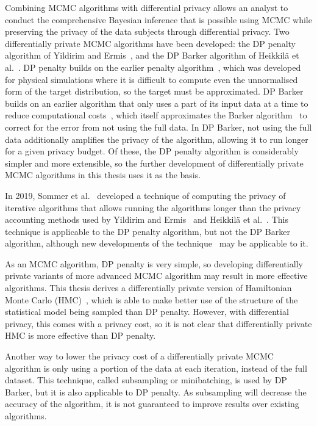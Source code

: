\documentclass[english,twoside,openright]{HYgraduMLDS}
\begin{document}
Combining MCMC algorithms with differential privacy allows
an analyst to conduct the comprehensive Bayesian inference that is
possible using MCMC while preserving the privacy of the data subjects through
differential privacy. Two differentially private MCMC algorithms have been
developed: the DP penalty algorithm of Yildirim and Ermis~\cite{YildirimE19},
and the DP Barker algorithm of Heikkilä et al.~\cite{HeikkilaJDH19}.
DP penalty builds on the earlier penalty algorithm~\cite{CeD99}, which was
developed for physical simulations where it is difficult to compute even the
unnormalised form of the target distribution, so the target
must be approximated. DP Barker builds on an earlier algorithm that only
uses a part of its input data at a time to reduce computational
costs~\cite{SPC17}, which itself approximates the Barker algorithm~\cite{Barker65}
to correct for the error from not using the full data. In DP Barker, not using the
full data additionally amplifies the privacy of the algorithm,
allowing it to run longer for a given privacy budget.
Of these, the DP penalty algorithm is considerably simpler and more extensible,
so the further development of differentially private MCMC algorithms in this
thesis uses it as the basis.

In 2019, Sommer et al.~\cite{Sommer2019} developed a technique of
computing the privacy of
iterative algorithms that allows running the algorithms longer than the
privacy accounting methods used by Yildirim and Ermis~\cite{YildirimE19} and
Heikkilä et al.~\cite{HeikkilaJDH19}. This technique is applicable to the
DP penalty algorithm, but not the DP Barker algorithm, although new developments
of the technique~\cite{KJH20} may be applicable to it.

As an MCMC algorithm, DP penalty is very simple, so developing differentially
private variants of more advanced MCMC algorithm may result in more effective
algorithms. This thesis derives a differentially private version of
Hamiltonian Monte Carlo (HMC)~\cite{neal2012mcmc, DKP87}, which is able to make
better use of the structure of the statistical model being sampled than DP penalty.
However, with differential privacy, this comes with a privacy cost, so it is
not clear that differentially private HMC is more effective than DP penalty.

Another way to lower the privacy cost of a differentially private MCMC
algorithm is only using a portion of the data at each iteration, instead of
the full dataset. This technique, called subsampling or minibatching, is used
by DP Barker, but it is also applicable to DP penalty. As subsampling will
decrease the accuracy of the algorithm, it is not guaranteed to improve results
over existing algorithms.
\end{document}
